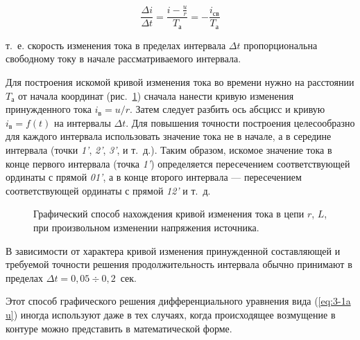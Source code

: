 \begin{equation}
	\frac{\Delta i}{\Delta t} = \frac{i- \frac{u}{r}}{T_{\text{а}}} = - \frac{i_{\text{св}}}{T_{\text{а}}}
	\label{eq:3-18 frac}
\end{equation}	

т.~е. скорость изменения тока в пределах интервала $ \Delta t $ пропорциональна свободному току в начале рассматриваемого интервала.

Для построения искомой кривой изменения тока во времени нужно на расстоянии $ T_{\text{а}} $ от начала координат (рис.~\ref{ris:3-9 graphic solve}) сначала нанести кривую изменения принужденного тока $ i_{\text{в}} = u/r $. Затем следует разбить ось абсцисс и кривую $ i_{\text{в}} = f(t) $ на интервалы $ \Delta t $. Для повышения точности построения целесообразно для каждого интервала использовать значение тока не в начале, а в середине интервала (точки \textit{1'}, \textit{2'}, \textit{3'},  и т.~д.). Таким образом, искомое значение тока в конце первого интервала (точка \textit{1'}) определяется пересечением соответствующей ординаты с прямой \textit{01'}, а в конце второго интервала --- пересечением соответствующей ординаты с прямой \textit{12'} и т.~д.

\begin{figure}[h]
	\caption{Графический способ нахождения кривой изменения тока в цепи $ r $, $ L $, при произвольном изменении напряжения источника.}
	\label{ris:3-9 graphic solve}
\end{figure}

В зависимости от характера кривой изменения принужденной составляющей и требуемой точности решения продолжительность интервала обычно принимают в пределах $ \Delta t = 0,05 \div 0,2 $~сек.

Этот способ графического решения дифференциального уравнения вида (\ref{eq:3-1a u}) иногда используют даже в тех случаях, когда происходящее возмущение в контуре можно представить в математической форме.